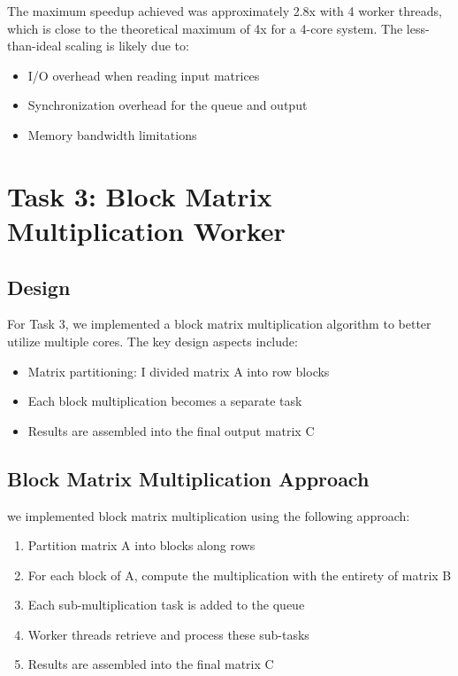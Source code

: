 \documentclass[11pt,a4paper]{article}
\begin{document}
The maximum speedup achieved was approximately 2.8x with 4 worker threads, which is close to the theoretical maximum of 4x for a 4-core system. The less-than-ideal scaling is likely due to:

\begin{itemize}
    \item I/O overhead when reading input matrices
    \item Synchronization overhead for the queue and output
    \item Memory bandwidth limitations
\end{itemize}

\section{Task 3: Block Matrix Multiplication Worker}

\subsection{Design}
For Task 3, we implemented a block matrix multiplication algorithm to better utilize multiple cores. The key design aspects include:

\begin{itemize}
    \item Matrix partitioning: I divided matrix A into row blocks
    \item Each block multiplication becomes a separate task
    \item Results are assembled into the final output matrix C
\end{itemize}

\subsection{Block Matrix Multiplication Approach}
we implemented block matrix multiplication using the following approach:

\begin{enumerate}
    \item Partition matrix A into blocks along rows
    \item For each block of A, compute the multiplication with the entirety of matrix B
    \item Each sub-multiplication task is added to the queue
    \item Worker threads retrieve and process these sub-tasks
    \item Results are assembled into the final matrix C
\end{enumerate}
\end{document}
